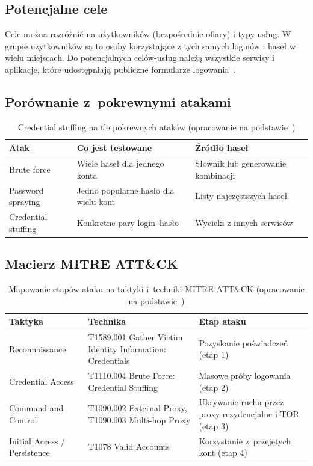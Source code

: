 \documentclass[12pt,a4paper]{article}
\begin{document}
\subsection{Potencjalne cele}
Cele można rozróżnić na użytkowników (bezpośrednie ofiary) i typy usług. W grupie użytkowników są to osoby korzystające z tych samych loginów i haseł w wielu miejscach. Do potencjalnych celów-usług należą wszystkie serwisy i aplikacje, które udostępniają publiczne formularze logowania~\cite{mitre_t1110004}.

\subsection{Porównanie z~pokrewnymi atakami}

\begin{table}[h]
\centering
\small
\begin{tabularx}{\linewidth}{@{}l>{\raggedright\arraybackslash}X>{\raggedright\arraybackslash}X@{}}
\toprule
\textbf{Atak} & \textbf{Co jest testowane} & \textbf{Źródło haseł} \\
\midrule
Brute force & Wiele haseł dla jednego konta & Słownik lub generowanie kombinacji \\
Password spraying & Jedno popularne hasło dla wielu kont & Listy najczęstszych haseł \\
Credential stuffing & Konkretne pary login--hasło & Wycieki z innych serwisów \\
\bottomrule
\end{tabularx}
\caption{Credential stuffing na tle pokrewnych ataków (opracowanie na podstawie~\cite{owasp_cheatsheet})}
\end{table}

\subsection{Macierz MITRE ATT\&CK}
\begin{table}[h]
\centering
\small
\begin{tabularx}{\linewidth}{@{}>{\raggedright\arraybackslash}p{3.2cm}>{\raggedright\arraybackslash}p{5.6cm}>{\raggedright\arraybackslash}X@{}}
\toprule
\textbf{Taktyka} & \textbf{Technika} & \textbf{Etap ataku} \\
\midrule
Reconnaissance & T1589.001 Gather Victim Identity Information: Credentials &
  Pozyskanie poświadczeń (etap 1) \\
Credential Access & T1110.004 Brute Force: Credential Stuffing &
  Masowe próby logowania (etap 2) \\
Command and Control & T1090.002 External Proxy, T1090.003 Multi-hop Proxy &
  Ukrywanie ruchu przez proxy rezydencjalne i TOR (etap 3) \\
Initial Access / Persistence & T1078 Valid Accounts &
  Korzystanie z~przejętych kont (etap 4) \\
\bottomrule
\end{tabularx}
\caption{Mapowanie etapów ataku na taktyki i~techniki MITRE ATT\&CK (opracowanie na podstawie~\cite{mitre_t1110004})}
\end{table}
\end{document}

